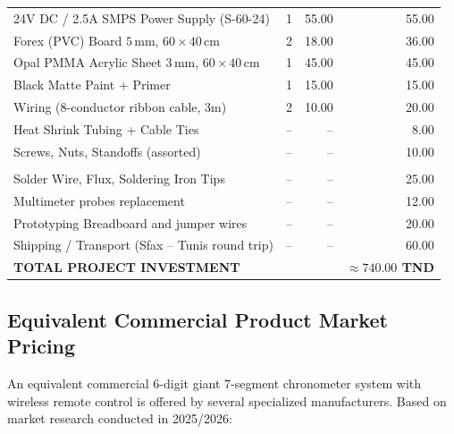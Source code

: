 \documentclass[12pt,a4paper,oneside]{report}
\begin{document}
\begin{table}[H]
\begin{tabularx}{\textwidth}{>{\raggedright\arraybackslash}X c r r}
24V DC / 2.5A SMPS Power Supply (S-60-24) & 1 & 55.00 & 55.00 \\
Forex (PVC) Board $5\,\text{mm}$, $60\times40\,\text{cm}$ & 2 & 18.00 & 36.00 \\
Opal PMMA Acrylic Sheet $3\,\text{mm}$, $60\times40\,\text{cm}$ & 1 & 45.00 & 45.00 \\
Black Matte Paint + Primer & 1 & 15.00 & 15.00 \\
Wiring (8-conductor ribbon cable, 3m) & 2 & 10.00 & 20.00 \\
Heat Shrink Tubing + Cable Ties & -- & -- & 8.00 \\
Screws, Nuts, Standoffs (assorted) & -- & -- & 10.00 \\
\midrule
\multicolumn{4}{l}{\textit{\textbf{Miscellaneous and Consumables}}} \\
Solder Wire, Flux, Soldering Iron Tips & -- & -- & 25.00 \\
Multimeter probes replacement & -- & -- & 12.00 \\
Prototyping Breadboard and jumper wires & -- & -- & 20.00 \\
Shipping / Transport (Sfax -- Tunis round trip) & -- & -- & 60.00 \\
\midrule
\textbf{TOTAL PROJECT INVESTMENT} & & & \textbf{$\approx 740.00$ TND} \\
\bottomrule
\end{tabularx}
\end{table}

\subsection{Equivalent Commercial Product Market Pricing}
An equivalent commercial 6-digit giant 7-segment chronometer system with wireless remote control is offered by several specialized manufacturers. Based on market research conducted in 2025/2026:
\end{document}
